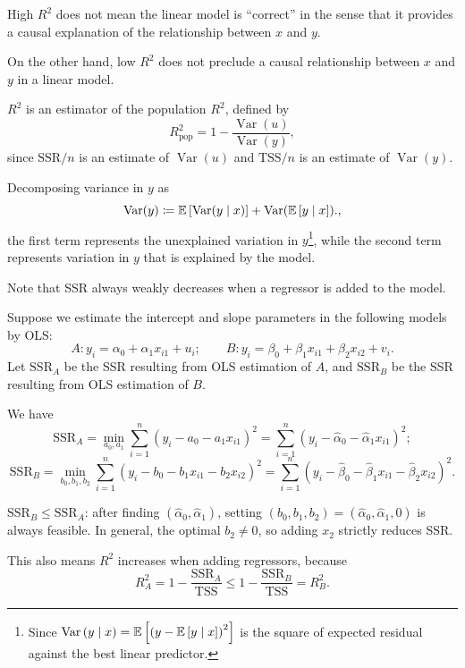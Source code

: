 \begin{remark}	High $R^2$ does not mean the linear model is ``correct'' in the sense that it provides a causal explanation of the relationship between $x$ and $y$.

	On the other hand, low $R^2$ does not preclude a causal relationship between $x$ and $y$ in a linear model.

	$R^2$ is an estimator of the population $R^2$, defined by
	\[
		R^2_{\text{pop}}=1-\frac{\operatorname{Var}(u)}{\operatorname{Var}(y)},
	\]
	since $\text{SSR}/n$ is an estimate of $\operatorname{Var}(u)$ and $\text{TSS}/n$ is an estimate of $\operatorname{Var}(y)$.

	Decomposing variance in $y$ as
	\[
		\operatorname{Var}(y)\coloneqq\mathbb{E}\left[\operatorname{Var}(y\mid x)\right]+\operatorname{Var}(\mathbb{E}\left[y\mid x\right]).
	,\]
	the first term represents the unexplained variation in $y$\footnote{Since $\operatorname{Var}\left(y \mid x\right) = \mathbb{E}\left[\left( y - \mathbb{E}\left[y\mid x\right]  \right)^2\right]$ is the square of expected residual against the best linear predictor.}, while the second term represents variation in $y$ that is explained by the model.
\end{remark}

\begin{remark}	Note that SSR always weakly decreases when a regressor is added to the model.

	Suppose we estimate the intercept and slope parameters in the following models by OLS:
	\[
		A:y_i=\alpha_0+\alpha_1x_{i1}+u_i;\qquad
		B:y_i=\beta_0+\beta_1x_{i1}+\beta_2x_{i2}+v_i.
	\]
	Let $\text{SSR}_A$ be the SSR resulting from OLS estimation of $A$, and $\text{SSR}_B$ be the SSR resulting from OLS estimation of $B$.

	We have
	\[
		\text{SSR}_A=\min_{a_0,a_1}\sum_{i=1}^n(y_i-a_0-a_1x_{i1})^2=\sum_{i=1}^n(y_i-\hat\alpha_0-\hat\alpha_1x_{i1})^2;
	\]
	\[
		\text{SSR}_B=\min_{b_0,b_1,b_2}\sum_{i=1}^n(y_i-b_0-b_1x_{i1}-b_2x_{i2})^2=\sum_{i=1}^n(y_i-\hat\beta_0-\hat\beta_1x_{i1}-\hat\beta_2x_{i2})^2.
	\]

	$\text{SSR}_B\le\text{SSR}_A$: after finding $(\hat\alpha_0,\hat\alpha_1)$, setting $(b_0,b_1,b_2)=(\hat\alpha_0,\hat\alpha_1,0)$ is always feasible. In general, the optimal $b_2\ne0$, so adding $x_2$ strictly reduces SSR.

	This also means $R^2$ increases when adding regressors, because
	\[
		R^2_A=1-\frac{\text{SSR}_A}{\text{TSS}}\le 1-\frac{\text{SSR}_B}{\text{TSS}}=R^2_B.
	\]
\end{remark}

